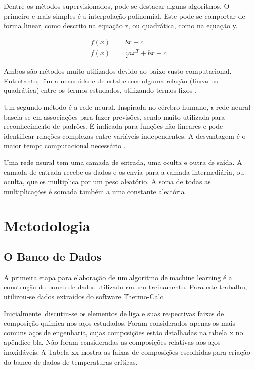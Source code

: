 \documentclass[brazil,dissertacao,epusp]{usp}
\begin{document}
Dentre os métodos supervisionados, pode-se destacar alguns algoritmos. O primeiro e mais simples é a interpolação polinomial. Este pode se comportar de forma linear, como descrito na equação x, ou quadrática, como na equação y.

\begin{align}
  f(x) &= b x + c \\
  f(x) &= \frac{1}{2} a x^T + b x + c
\end{align}

Ambos são métodos muito utilizados devido ao baixo custo computacional. Entretanto, têm a necessidade de estabelecer alguma relação (linear ou quadrática) entre os termos estudados, utilizando termos fixos \cite{Bhadeshia1999}.

Um segundo método é a rede neural. Inspirada no cérebro humano, a rede neural baseia-se em associações para fazer previsões, sendo muito utilizada para reconhecimento de padrões. É indicada para funções não lineares e pode identificar relações complexas entre variáveis independentes. A desvantagem é o maior tempo computacional necessário \cite{Belisle2015}.

Uma rede neural tem uma camada de entrada, uma oculta e outra de saída. A camada de entrada recebe os dados e os envia para a camada intermediária, ou oculta, que os multiplica por um peso aleatório. A soma de todas as multiplicações é somada também a uma constante aleatória

\chapter{Metodologia}

\section{O Banco de Dados}

\label{sec:banco_dados}

A primeira etapa para elaboração de um algoritmo de machine learning é a construção do banco de dados utilizado em seu treinamento. Para este trabalho, utilizou-se dados extraídos do software Thermo-Calc\textregistered{}.

Inicialmente, discutiu-se os elementos de liga e suas respectivas faixas de composição química nos aços estudados. Foram considerados apenas os mais comuns aços de engenharia, cujas composições estão detalhadas na tabela x no apêndice bla. Não foram consideradas as composições relativas aos aços inoxidáveis. A Tabela xx mostra as faixas de composições escolhidas para criação do banco de dados de temperaturas críticas.
\end{document}
